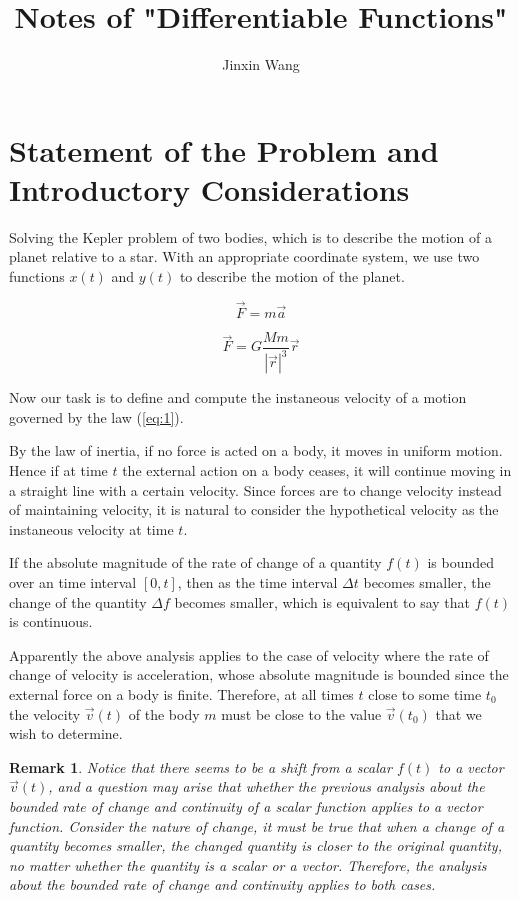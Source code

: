 \documentclass[onecolumn]{ctexart}
\title{Notes of "Differentiable Functions"}
\author{Jinxin Wang}
\date{}
\newtheorem{remark}{Remark}
\begin{document}
\maketitle

\section{Statement of the Problem and Introductory Considerations}

Solving the Kepler problem of two bodies, which is to describe the motion of a 
planet relative to a star. With an appropriate coordinate system, we use two 
functions $x(t)$ and $y(t)$ to describe the motion of the planet.

\begin{equation} \label{eq:1}
  \vec{F} = m \vec{a}
\end{equation}

\begin{equation}
  \vec{F} = G\frac{Mm}{|\vec{r}|^3}\vec{r}
\end{equation}

Now our task is to define and compute the instaneous velocity of a motion 
governed by the law (\ref{eq:1}).

By the law of inertia, if no force is acted on a body, it moves in uniform 
motion. Hence if at time $t$ the external action on a body ceases, it will 
continue moving in a straight line with a certain velocity. Since forces are to 
change velocity instead of maintaining velocity, it is natural to consider the 
hypothetical velocity as the instaneous velocity at time $t$.

If the absolute magnitude of the rate of change of a quantity $f(t)$ is bounded 
over an time interval $[0, t]$, then as the time interval $\Delta t$ becomes 
smaller, the change of the quantity $\Delta f$ becomes smaller, which is 
equivalent to say that $f(t)$ is continuous.

Apparently the above analysis applies to the case of velocity where the rate of 
change of velocity is acceleration, whose absolute magnitude is bounded since 
the external force on a body is finite. Therefore, at all times $t$ close to 
some time $t_0$ the velocity $\vec{v}(t)$ of the body $m$ must be close to the 
value $\vec{v}(t_0)$ that we wish to determine.
\begin{remark}
  Notice that there seems to be a shift from a scalar $f(t)$ to a vector 
  $\vec{v}(t)$, and a question may arise that whether the previous analysis 
  about the bounded rate of change and continuity of a scalar function applies 
  to a vector function. Consider the nature of change, it must be true that when 
  a change of a quantity becomes smaller, the changed quantity is closer to the 
  original quantity, no matter whether the quantity is a scalar or a vector. 
  Therefore, the analysis about the bounded rate of change and continuity 
  applies to both cases.
\end{remark}
\end{document}
